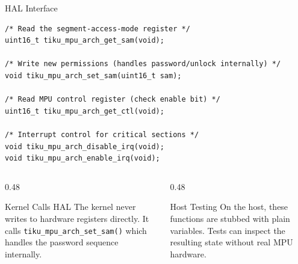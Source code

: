 \documentclass[aspectratio=169, 10pt]{beamer}
\begin{document}
\begin{frame}[fragile]{HAL Interface}
\begin{lstlisting}[style=cstyle, title={hal/tiku\_mpu\_hal.h --- Platform functions}]
/* Read the segment-access-mode register */
uint16_t tiku_mpu_arch_get_sam(void);

/* Write new permissions (handles password/unlock internally) */
void tiku_mpu_arch_set_sam(uint16_t sam);

/* Read MPU control register (check enable bit) */
uint16_t tiku_mpu_arch_get_ctl(void);

/* Interrupt control for critical sections */
void tiku_mpu_arch_disable_irq(void);
void tiku_mpu_arch_enable_irq(void);
\end{lstlisting}

\vspace{0.3em}
\begin{columns}[T]
\begin{column}{0.48\textwidth}
\begin{block}{Kernel Calls HAL}
The kernel never writes to hardware registers directly.
It calls \texttt{tiku\_mpu\_arch\_set\_sam()} which handles
the password sequence internally.
\end{block}
\end{column}
\begin{column}{0.48\textwidth}
\begin{block}{Host Testing}
On the host, these functions are stubbed with plain
variables. Tests can inspect the resulting state
without real MPU hardware.
\end{block}
\end{column}
\end{columns}
\end{frame}
\end{document}
